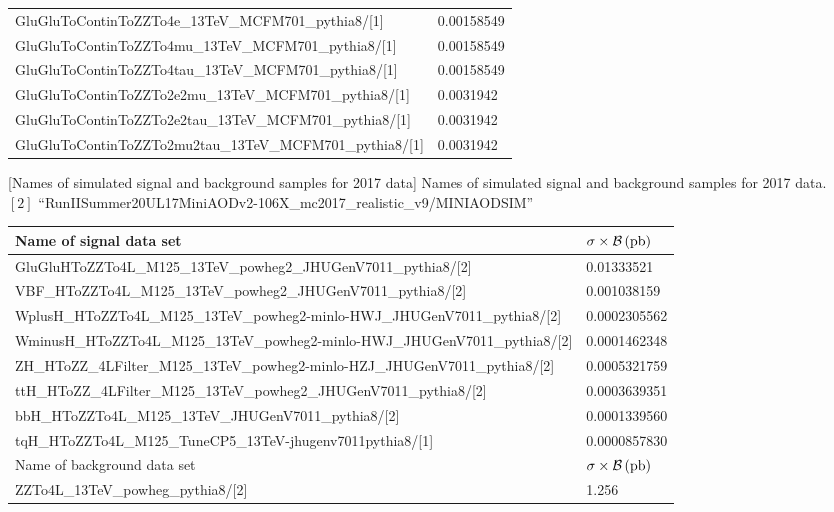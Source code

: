 \begin{table}[h]
\begin{tabular}{|ll|}
		GluGluToContinToZZTo4e\_13TeV\_MCFM701\_pythia8/[1]	&	0.00158549	\\
		GluGluToContinToZZTo4mu\_13TeV\_MCFM701\_pythia8/[1]	&	0.00158549	\\
		GluGluToContinToZZTo4tau\_13TeV\_MCFM701\_pythia8/[1]	&	0.00158549	\\
		GluGluToContinToZZTo2e2mu\_13TeV\_MCFM701\_pythia8/[1]	&	0.0031942	\\
		GluGluToContinToZZTo2e2tau\_13TeV\_MCFM701\_pythia8/[1]	&	0.0031942	\\
		GluGluToContinToZZTo2mu2tau\_13TeV\_MCFM701\_pythia8/[1]	&	0.0031942	\\
        \hline
        \end{tabular}
    \label{table:dilep_2016_simSamples}
\end{table}
\begin{table}[h]
    \small
        [Names of simulated signal and background samples for 2017 data] %
        {Names of simulated signal and background samples for 2017 data. \\ %
        $[2]$ ``RunIISummer20UL17MiniAODv2-106X\_mc2017\_realistic\_v9/MINIAODSIM''}
	\begin{tabular}{|ll|}
		\hline      
        Name of signal data set & $\sigma \times \mathcal{B}\,(\text{pb})$ \\
        \hline
		GluGluHToZZTo4L\_M125\_13TeV\_powheg2\_JHUGenV7011\_pythia8/[2]	&	0.01333521	\\
		VBF\_HToZZTo4L\_M125\_13TeV\_powheg2\_JHUGenV7011\_pythia8/[2]	&	0.001038159	\\
		WplusH\_HToZZTo4L\_M125\_13TeV\_powheg2-minlo-HWJ\_JHUGenV7011\_pythia8/[2]	&	0.0002305562	\\
		WminusH\_HToZZTo4L\_M125\_13TeV\_powheg2-minlo-HWJ\_JHUGenV7011\_pythia8/[2]	&	0.0001462348	\\
		ZH\_HToZZ\_4LFilter\_M125\_13TeV\_powheg2-minlo-HZJ\_JHUGenV7011\_pythia8/[2]	&	0.0005321759	\\
		ttH\_HToZZ\_4LFilter\_M125\_13TeV\_powheg2\_JHUGenV7011\_pythia8/[2]	&	0.0003639351	\\
		bbH\_HToZZTo4L\_M125\_13TeV\_JHUGenV7011\_pythia8/[2]	&	0.0001339560	\\
		tqH\_HToZZTo4L\_M125\_TuneCP5\_13TeV-jhugenv7011\-pythia8/[1]	&	0.0000857830	\\
		\hline	
		\hline	
        Name of background data set & $\sigma \times \mathcal{B}\,(\text{pb})$ \\
		\hline	
		ZZTo4L\_13TeV\_powheg\_pythia8/[2]	&	1.256	\\

\end{tabular}
\end{table}
